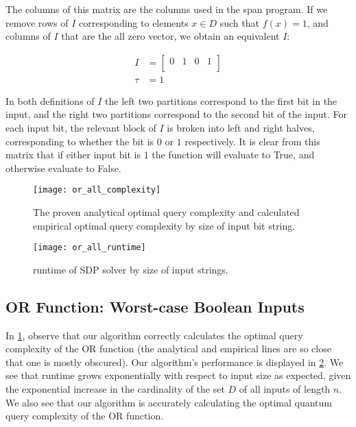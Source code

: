 The columns of this matrix are the columns used in the span program. If we remove rows of $I$ corresponding to elements $ x \in D$ such that $f(x) = 1$, and columns of $I$ that are the all zero vector, we obtain an equivalent $I$:

\begin{align}
I &= \left[\begin{array}{c|c|c|c}
   0 & 1 & 0 & 1 \\
\end{array} \right] \nonumber \\
\tau &= 1 \nonumber
\end{align}

In both definitions of $I$ the left two partitions correspond to the first bit in the
input, and the right two partitions correspond to the second bit of the input. For each
input bit, the relevant block of $I$ is broken into left and right halves, corresponding
to whether the bit is $0$ or $1$ respectively. It is clear from this matrix that if either input bit is $1$ the function will evaluate to True, and otherwise evaluate to False.

\begin{figure}[ht]
\centering
\texttt{[image: or\_all\_complexity]}
\caption{The proven analytical optimal query complexity
and calculated empirical optimal query complexity by 
size of input bit string.}
\label{fig:or_all_complexity}
\end{figure}

\begin{figure}[ht]
\centering
\texttt{[image: or\_all\_runtime]}
\caption{runtime of SDP solver by size of input strings.}
\label{fig:or_all_runtime}
\end{figure}

\subsection{OR Function: Worst-case Boolean Inputs}\label{sec:speed}
In \cref{fig:or_all_complexity}, observe that our algorithm
correctly calculates the optimal query complexity of the OR function (the
analytical and empirical lines are so close that one
is mostly obscured).
Our algorithm's performance is displayed in \cref{fig:or_all_runtime}.
We see that runtime grows exponentially with respect to input size as expected, 
given the exponential increase in the cardinality of the set $D$ of all
inputs of length $n$. 
We also see that our algorithm is accurately calculating the
optimal quantum query complexity of the OR function. 

